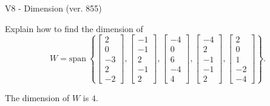 \begin{exercise}
  \begin{exerciseTitle}V8 - Dimension (ver. 855)\end{exerciseTitle}
  \begin{exerciseStatement}
    Explain how to find the dimension of 
\[W=\mathrm{span}\ \left\{\left[\begin{array}{r}
2 \\
0 \\
-3 \\
2 \\
-2
\end{array}\right] , \left[\begin{array}{r}
-1 \\
-1 \\
2 \\
-1 \\
2
\end{array}\right] , \left[\begin{array}{r}
-4 \\
0 \\
6 \\
-4 \\
4
\end{array}\right] , \left[\begin{array}{r}
-4 \\
2 \\
-1 \\
-1 \\
2
\end{array}\right] , \left[\begin{array}{r}
2 \\
0 \\
1 \\
-2 \\
-4
\end{array}\right]\right\}.\]



  \end{exerciseStatement}
  \begin{exerciseAnswer}
   The dimension of \(W\) is  \(4\).
  


  \end{exerciseAnswer}
\end{exercise}
